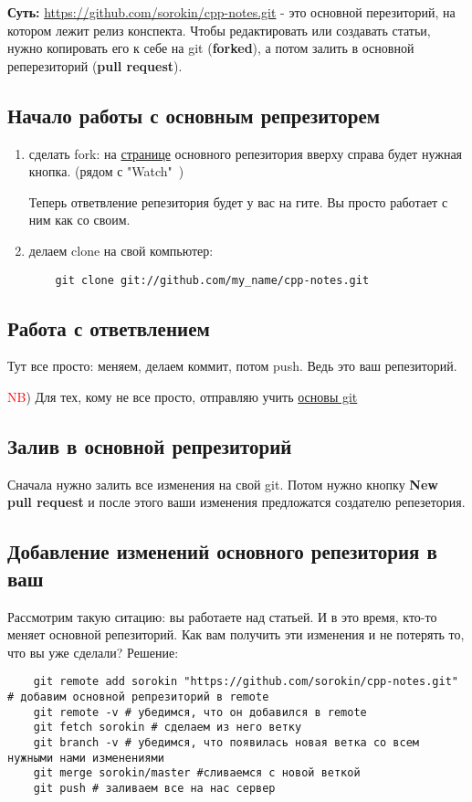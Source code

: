 \documentclass[12pt]{article}
\begin{document}
{\bf Суть:} \url{https://github.com/sorokin/cpp-notes.git} - это основной перезиторий, на котором лежит релиз конспекта. Чтобы редактировать или создавать статьи, нужно копировать его к себе на git ({\bf forked}), а потом залить в основной реперезиторий ({\bf pull request}).
	\subsection{Начало работы с основным репрезиторем}
	\begin{enumerate}
	\item сделать fork: на \href{https://github.com/sorokin/cpp-notes}{странице} основного репезитория  вверху справа будет нужная кнопка. (рядом с "Watch"\ )
	
	
	Теперь ответвление репезитория будет у вас на гите. Вы просто работает с ним как со своим.
	\item делаем clone на свой компьютер: 
	\begin{verbatim}
	git clone git://github.com/my_name/cpp-notes.git
	\end{verbatim}	
	\end{enumerate}
	\subsection{Работа с ответвлением}
	 Тут все просто: меняем, делаем коммит, потом push. Ведь это ваш репезиторий.

	
	\textcolor{red}{NB}) Для тех, кому не все просто, отправляю учить \href{https://git-scm.com/book/ru/v1}{основы git}
	\subsection{Залив в основной репрезиторий}
	Сначала нужно залить все изменения на свой git. Потом нужно кнопку \textbf{New pull request} и после этого ваши изменения предложатся создателю репезетория.
	
	\subsection{Добавление изменений основного репезитория в ваш}
	Рассмотрим такую ситацию: вы работаете над статьей. И в это время, кто-то меняет основной репезиторий. Как вам получить эти изменения и не потерять то, что вы уже сделали?
	Решение:
	\begin{verbatim}
	git remote add sorokin "https://github.com/sorokin/cpp-notes.git" # добавим основной репрезиторий в remote
	git remote -v # убедимся, что он добавился в remote
	git fetch sorokin # сделаем из него ветку
	git branch -v # убедимся, что появилась новая ветка со всем нужными нами изменениями
	git merge sorokin/master #сливаемся с новой веткой
	git push # заливаем все на нас сервер
	\end{verbatim}
	
\end{document}
